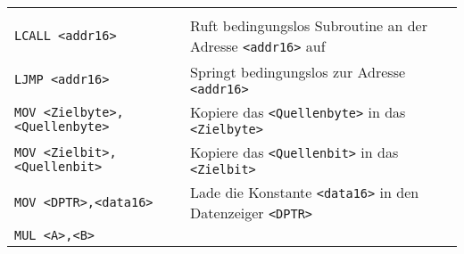 \begin{longtable}[c]{@{}ll@{}}
\begin{minipage}[t]{0.69\columnwidth}
\strut\end{minipage}\tabularnewline
\begin{minipage}[t]{0.25\columnwidth}\raggedright\strut
\texttt{LCALL <addr16>}
\strut\end{minipage} & \begin{minipage}[t]{0.69\columnwidth}\raggedright\strut
Ruft bedingungslos Subroutine an der Adresse \texttt{<addr16>} auf
\strut\end{minipage}\tabularnewline
\begin{minipage}[t]{0.25\columnwidth}\raggedright\strut
\texttt{LJMP <addr16>}
\strut\end{minipage} & \begin{minipage}[t]{0.69\columnwidth}\raggedright\strut
Springt bedingungslos zur Adresse \texttt{<addr16>}
\strut\end{minipage}\tabularnewline
\begin{minipage}[t]{0.25\columnwidth}\raggedright\strut
\texttt{MOV <Zielbyte>,} \texttt{<Quellenbyte>}
\strut\end{minipage} & \begin{minipage}[t]{0.69\columnwidth}\raggedright\strut
Kopiere das \texttt{<Quellenbyte>} in das \texttt{<Zielbyte>}
\strut\end{minipage}\tabularnewline
\begin{minipage}[t]{0.25\columnwidth}\raggedright\strut
\texttt{MOV <Zielbit>,} \texttt{<Quellenbit>}
\strut\end{minipage} & \begin{minipage}[t]{0.69\columnwidth}\raggedright\strut
Kopiere das \texttt{<Quellenbit>} in das \texttt{<Zielbit>}
\strut\end{minipage}\tabularnewline
\begin{minipage}[t]{0.25\columnwidth}\raggedright\strut
\texttt{MOV <DPTR>,<data16>}
\strut\end{minipage} & \begin{minipage}[t]{0.69\columnwidth}\raggedright\strut
Lade die Konstante \texttt{<data16>} in den Datenzeiger \texttt{<DPTR>}
\strut\end{minipage}\tabularnewline
\begin{minipage}[t]{0.25\columnwidth}\raggedright\strut
\texttt{MUL <A>,<B>}
\strut\end{minipage} & \begin{minipage}[t]{0.69\columnwidth}\raggedright\strut

\end{minipage}
\end{longtable}

